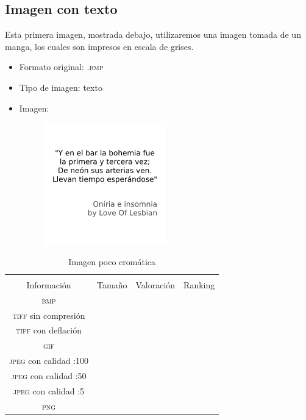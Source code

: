 \documentclass[11pt,a4paper]{article}
\begin{document}
\subsection{Imagen con texto}

Esta primera imagen, mostrada debajo, utilizaremos una imagen tomada de un manga, los cuales son impresos en escala de grises.

\begin{itemize}
	\item Formato original: \textsc{.bmp}
	\item Tipo de imagen: texto
	\item Imagen:
		\begin{figure}[H]
		\centering
			\includegraphics[width=0.5\textwidth]{Fotos/texto.png}
		\end{figure}	
\end{itemize}

\begin{table}[H]
\centering
\begin{tabular}{|c|c|c|c|}
\hline
\diagbox[width=15em]{\textit{Códec}/Formato}{\\Información} & Tamaño & Valoración & Ranking \\
\hline
\textsc{bmp} &  &  &  \\ \hline
\textsc{tiff} sin compresión &  &  &  \\ \hline
\textsc{tiff} con deflación &  &  &  \\ \hline
\textsc{gif} &  &  &  \\ \hline
\textsc{jpeg} con calidad :100 &  &  &  \\ \hline
\textsc{jpeg} con calidad :50 &  &  &  \\ \hline
\textsc{jpeg} con calidad :5 &  &  &  \\ \hline
\textsc{png} &  &  &  \\ \hline
\end{tabular}
\caption{Imagen poco cromática}
\label{tab:my-table}
\end{table}
\end{document}
